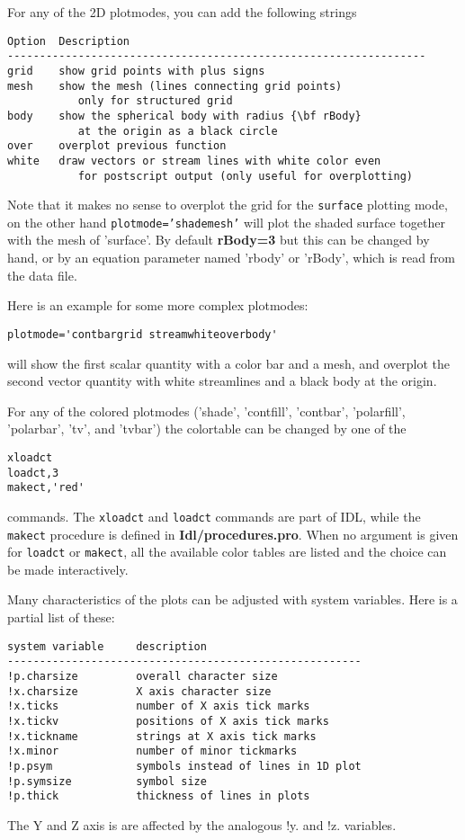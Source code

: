    For any of the 2D plotmodes, you can add the following strings
\begin{verbatim}
Option  Description
-----------------------------------------------------------------
grid    show grid points with plus signs
mesh    show the mesh (lines connecting grid points) 
           only for structured grid
body    show the spherical body with radius {\bf rBody} 
           at the origin as a black circle
over    overplot previous function
white   draw vectors or stream lines with white color even 
           for postscript output (only useful for overplotting)
\end{verbatim}
   Note that it makes no sense to overplot the grid for the 
   {\tt surface} plotting mode, on the other hand {\tt plotmode='shademesh'}
   will plot the shaded surface together with the mesh of 'surface'.
   By default {\bf rBody=3} but this can be changed by hand, or by an equation
   parameter named 'rbody' or 'rBody', which is read from the data file.

   Here is an example for some more complex plotmodes:
\begin{verbatim}
plotmode='contbargrid streamwhiteoverbody'
\end{verbatim} 
   will show the first scalar quantity with a color bar and a mesh,
   and overplot the second vector quantity with white streamlines
   and a black body at the origin.

   For any of the colored plotmodes ('shade', 'contfill', 'contbar', 
   'polarfill', 'polarbar', 'tv', and 'tvbar') the colortable can be 
   changed by one of the 
\begin{verbatim}
xloadct
loadct,3
makect,'red'
\end{verbatim}
   commands. The {\tt xloadct} and {\tt loadct} commands are part of IDL, while
   the {\tt makect} procedure is defined in {\bf Idl/procedures.pro}.
   When no argument is given for {\tt loadct} or {\tt makect}, 
   all the available color tables are listed
   and the choice can be made interactively.

   Many characteristics of the plots can be adjusted with system variables.
   Here is a partial list of these:
\begin{verbatim}
system variable     description
-------------------------------------------------------
!p.charsize         overall character size
!x.charsize         X axis character size
!x.ticks            number of X axis tick marks
!x.tickv            positions of X axis tick marks
!x.tickname         strings at X axis tick marks
!x.minor            number of minor tickmarks
!p.psym             symbols instead of lines in 1D plot
!p.symsize          symbol size
!p.thick            thickness of lines in plots
\end{verbatim}
  The Y and Z axis is are affected by the analogous !y. and !z. variables.

